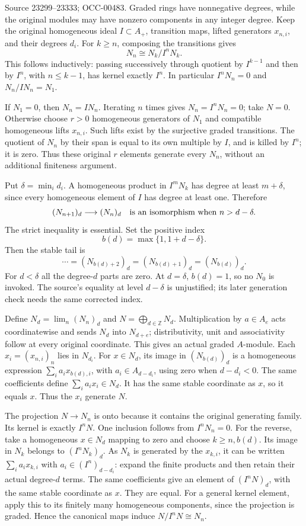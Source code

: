 Source 23299--23333; OCC-00483. Graded rings have nonnegative degrees, while the original modules may have nonzero components in any integer degree. Keep the original homogeneous ideal \(I\subset A_+\), transition maps, lifted generators \(x_{n,i}\), and their degrees \(d_i\). For \(k\geq n\), composing the transitions gives \[
N_n\cong N_k/I^nN_k .
\] This follows inductively: passing successively through quotient by \(I^{k-1}\) and then by \(I^n\), with \(n\leq k-1\), has kernel exactly \(I^n\). In particular \(I^nN_n=0\) and \(N_n/IN_n=N_1\).

If \(N_1=0\), then \(N_n=IN_n\). Iterating \(n\) times gives \(N_n=I^nN_n=0\); take \(N=0\). Otherwise choose \(r>0\) homogeneous generators of \(N_1\) and compatible homogeneous lifts \(x_{n,i}\). Such lifts exist by the surjective graded transitions. The quotient of \(N_n\) by their span is equal to its own multiple by \(I\), and is killed by \(I^n\); it is zero. Thus these original \(r\) elements generate every \(N_n\), without an additional finiteness argument.

Put \(\delta=\min_i d_i\). A homogeneous product in \(I^mN_k\) has degree at least \(m+\delta\), since every homogeneous element of \(I\) has degree at least one. Therefore \[
(N_{n+1})_d\longrightarrow(N_n)_d
\quad\hbox{is an isomorphism when }n>d-\delta.
\] The strict inequality is essential. Set the positive index \[
b(d)=\max\{1,1+d-\delta\}.
\] Then the stable tail is \[
\cdots=(N_{b(d)+2})_d=(N_{b(d)+1})_d=(N_{b(d)})_d.
\] For \(d<\delta\) all the degree-\(d\) parts are zero. At \(d=\delta\), \(b(d)=1\), so no \(N_0\) is invoked. The source's equality at level \(d-\delta\) is unjustified; its later generation check needs the same corrected index.

Define \(N_d=\lim_n(N_n)_d\) and \(N=\bigoplus_{d\in\mathbb Z}N_d\). Multiplication by \(a\in A_e\) acts coordinatewise and sends \(N_d\) into \(N_{d+e}\); distributivity, unit and associativity follow at every original coordinate. This gives an actual graded \(A\)-module. Each \(x_i=(x_{n,i})_n\) lies in \(N_{d_i}\). For \(x\in N_d\), its image in \((N_{b(d)})_d\) is a homogeneous expression \(\sum_i a_ix_{b(d),i}\), with \(a_i\in A_{d-d_i}\), using zero when \(d-d_i<0\). The same coefficients define \(\sum_i a_ix_i\in N_d\). It has the same stable coordinate as \(x\), so it equals \(x\). Thus the \(x_i\) generate \(N\).

The projection \(N\to N_n\) is onto because it contains the original generating family. Its kernel is exactly \(I^nN\). One inclusion follows from \(I^nN_n=0\). For the reverse, take a homogeneous \(x\in N_d\) mapping to zero and choose \(k\geq n,b(d)\). Its image in \(N_k\) belongs to \((I^nN_k)_d\). As \(N_k\) is generated by the \(x_{k,i}\), it can be written \(\sum_i a_ix_{k,i}\) with \(a_i\in (I^n)_{d-d_i}\): expand the finite products and then retain their actual degree-\(d\) terms. The same coefficients give an element of \((I^nN)_d\), with the same stable coordinate as \(x\). They are equal. For a general kernel element, apply this to its finitely many homogeneous components, since the projection is graded. Hence the canonical maps induce \(N/I^nN\cong N_n\).

